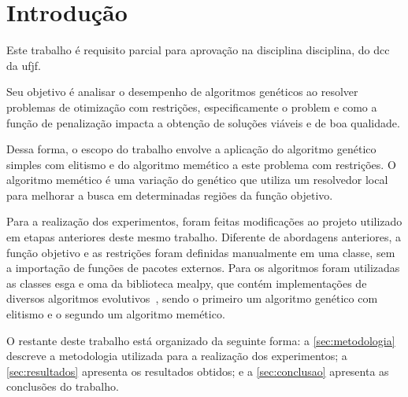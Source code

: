 \section{Introdução}%
\label{sec:introducao}

Este trabalho é requisito parcial para aprovação na disciplina \gls{disciplina}, do \gls{dcc} da \gls{ufjf}.

Seu objetivo é analisar o desempenho de algoritmos genéticos ao resolver problemas de otimização com restrições, especificamente o \gls{problem} e como a função de penalização impacta a obtenção de soluções viáveis e de boa qualidade.

Dessa forma, o escopo do trabalho envolve a aplicação do algoritmo genético simples com elitismo e do algoritmo memético a este problema com restrições. O algoritmo memético é uma variação do genético que utiliza um resolvedor local para melhorar a busca em determinadas regiões da função objetivo.

Para a realização dos experimentos, foram feitas modificações ao projeto utilizado em etapas anteriores deste mesmo trabalho. Diferente de abordagens anteriores, a função objetivo e as restrições foram definidas manualmente em uma classe, sem a importação de funções de pacotes externos.
Para os algoritmos foram utilizadas as classes \gls{esga} e \gls{oma} da biblioteca \gls{mealpy}, que contém implementações de diversos algoritmos evolutivos~\cite{mealpy_paper}, sendo o primeiro um algoritmo genético com elitismo e o segundo um algoritmo memético.


O restante deste trabalho está organizado da seguinte forma: a \autoref{sec:metodologia} descreve a metodologia utilizada para a realização dos experimentos; a \autoref{sec:resultados} apresenta os resultados obtidos; e a \autoref{sec:conclusao} apresenta as conclusões do trabalho.